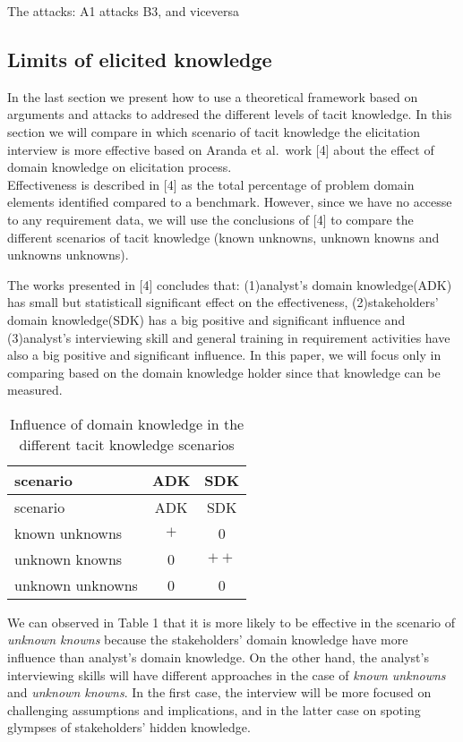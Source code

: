 \documentclass[]{llncs}
\begin{document}
The attacks: A1 attacks B3, and viceversa

\hypertarget{limits-of-elicited-knowledge}{%
\subsection{Limits of elicited
knowledge}\label{limits-of-elicited-knowledge}}

In the last section we present how to use a theoretical framework based
on arguments and attacks to addresed the different levels of tacit
knowledge. In this section we will compare in which scenario of tacit
knowledge the elicitation interview is more effective based on Aranda et
al.~work {[}4{]} about the effect of domain knowledge on elicitation
process.\\
Effectiveness is described in {[}4{]} as the total percentage of problem
domain elements identified compared to a benchmark. However, since we
have no accesse to any requirement data, we will use the conclusions of
{[}4{]} to compare the different scenarios of tacit knowledge (known
unknowns, unknown knowns and unknowns unknowns).

The works presented in {[}4{]} concludes that: (1)analyst's domain
knowledge(ADK) has small but statisticall significant effect on the
effectiveness, (2)stakeholders' domain knowledge(SDK) has a big positive
and significant influence and (3)analyst's interviewing skill and
general training in requirement activities have also a big positive and
significant influence. In this paper, we will focus only in comparing
based on the domain knowledge holder since that knowledge can be
measured.

\begin{longtable}[]{@{}lcc@{}}
\caption{Influence of domain knowledge in the different tacit knowledge
scenarios}\tabularnewline
\toprule
scenario & ADK & SDK\tabularnewline
\midrule
\endfirsthead
\toprule
scenario & ADK & SDK\tabularnewline
\midrule
\endhead
known unknowns & \(+\) & 0\tabularnewline
unknown knowns & 0 & \(++\)\tabularnewline
unknown unknowns & 0 & 0\tabularnewline
\bottomrule
\end{longtable}

We can observed in Table 1 that it is more likely to be effective in the
scenario of \emph{unknown knowns} because the stakeholders' domain
knowledge have more influence than analyst's domain knowledge. On the
other hand, the analyst's interviewing skills will have different
approaches in the case of \emph{known unknowns} and \emph{unknown
knowns}. In the first case, the interview will be more focused on
challenging assumptions and implications, and in the latter case on
spoting glympses of stakeholders' hidden knowledge.
\end{document}
